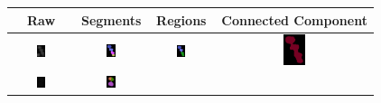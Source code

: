 \begin{table}
    \centering
    \begin{tabular}{cccc}
        \toprule
        \multicolumn{1}{c}{Raw} & \multicolumn{1}{c}{Segments} & \multicolumn{1}{c}{Regions} & \multicolumn{1}{c}{Connected Component} \\ \midrule
        \includegraphics[width=0.15\textwidth]{images/joint/overseg/75/01/raw.png}
        & \includegraphics[width=0.15\textwidth]{images/joint/overseg/75/01/colored00.png}
        & \includegraphics[width=0.15\textwidth]{images/joint/overseg/75/01/colored01_all.png}
        & \includegraphics[width=0.15\textwidth]{images/joint/overseg/75/01/colored02.png} \\
        \includegraphics[width=0.15\textwidth]{images/joint/overseg/75/02/raw.png}
        & \includegraphics[width=0.15\textwidth]{images/joint/overseg/75/02/colored00.png}

\end{tabular}
\end{table}
